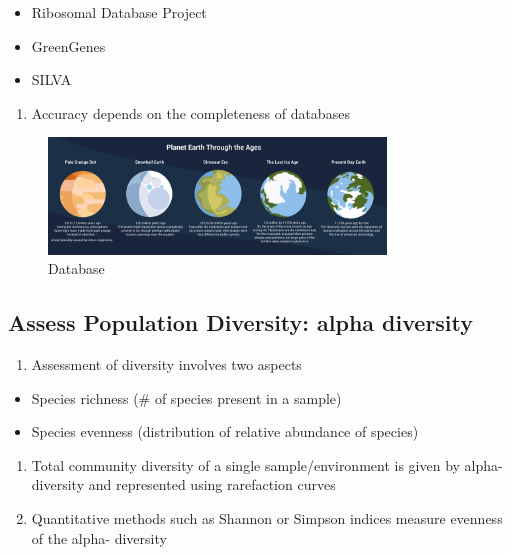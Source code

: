 \documentclass[
]{book}
\providecommand{\tightlist}{%
  \setlength{\itemsep}{0pt}\setlength{\parskip}{0pt}}
\begin{document}
\begin{itemize}
\tightlist
\item
  Ribosomal Database Project
\item
  GreenGenes
\item
  SILVA
\end{itemize}

\begin{enumerate}
\def\labelenumi{\arabic{enumi}.}
\setcounter{enumi}{1}
\tightlist
\item
  Accuracy depends on the completeness of databases
\end{enumerate}

\begin{figure}
\centering
\includegraphics[width=0.8\textwidth,height=\textheight]{./Figures/Planets.png}
\caption{Database}
\end{figure}

\hypertarget{assess-population-diversity-alpha-diversity}{%
\subsection{\texorpdfstring{Assess Population Diversity: \textbf{alpha diversity}}{Assess Population Diversity: alpha diversity}}\label{assess-population-diversity-alpha-diversity}}

\begin{enumerate}
\def\labelenumi{\arabic{enumi}.}
\tightlist
\item
  Assessment of diversity involves two aspects
\end{enumerate}

\begin{itemize}
\tightlist
\item
  Species richness (\# of species present in a sample)
\item
  Species evenness (distribution of relative abundance of species)
\end{itemize}

\begin{enumerate}
\def\labelenumi{\arabic{enumi}.}
\setcounter{enumi}{1}
\item
  Total community diversity of a single sample/environment is given by alpha-diversity and represented using rarefaction curves
\item
  Quantitative methods such as Shannon or Simpson indices measure evenness of the alpha- diversity
\end{enumerate}
\end{document}
